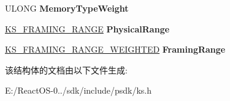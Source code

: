 \begin{DoxyCompactItemize}
U\+L\+O\+NG {\bfseries Memory\+Type\+Weight}
\item 
\mbox{\label{struct_k_s___f_r_a_m_i_n_g___i_t_e_m_a06823370f24c9d5bbb3e22db619a0411}} 
\hyperlink{struct_k_s___f_r_a_m_i_n_g___r_a_n_g_e}{K\+S\+\_\+\+F\+R\+A\+M\+I\+N\+G\+\_\+\+R\+A\+N\+GE} {\bfseries Physical\+Range}
\item 
\mbox{\label{struct_k_s___f_r_a_m_i_n_g___i_t_e_m_afead0f728d577cc7ddb6d18666d4090c}} 
\hyperlink{struct_k_s___f_r_a_m_i_n_g___r_a_n_g_e___w_e_i_g_h_t_e_d}{K\+S\+\_\+\+F\+R\+A\+M\+I\+N\+G\+\_\+\+R\+A\+N\+G\+E\+\_\+\+W\+E\+I\+G\+H\+T\+ED} {\bfseries Framing\+Range}
\end{DoxyCompactItemize}


该结构体的文档由以下文件生成\+:\begin{DoxyCompactItemize}
\item 
E\+:/\+React\+O\+S-\/0../sdk/include/psdk/ks.\+h\end{DoxyCompactItemize}
